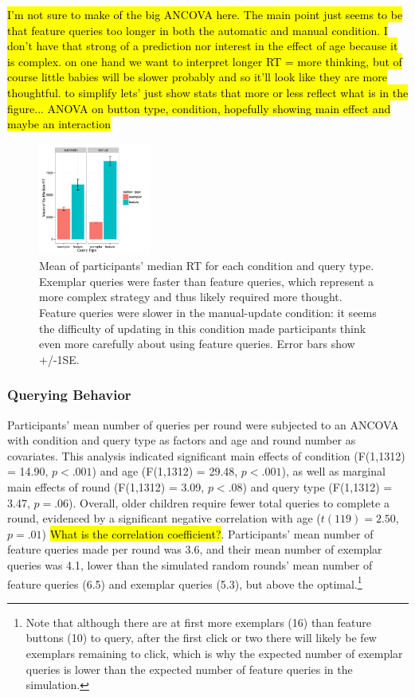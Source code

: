 \documentclass[10pt,letterpaper]{article}
\begin{document}
\hl{I'm not sure to make of the big ANCOVA here.  The main point just seems to be that
feature queries too longer in both the automatic and manual condition.  I don't have
that strong of a prediction nor interest in the effect of age because it is complex.  on
one hand we want to interpret longer RT = more thinking, but of course little babies
will be slower probably and so it'll look like they are more thoughtful.  to simplify
lets' just show stats that more or less reflect what is in the figure...  ANOVA on
button type, condition, hopefully showing main effect and maybe an interaction}

\begin{figure}[h]
  \centering
  \includegraphics[width=0.33\textwidth]{figures/RT_by_condition_query_type}
  \caption{Mean of participants' median RT for each condition and query type. 
Exemplar queries were faster than feature queries, which represent a more complex 
strategy and thus likely required more thought. Feature queries were slower in the 
manual-update condition: it seems the difficulty of updating in this condition made 
participants think even more carefully about using feature queries. Error bars show 
+/-1SE.}
  \label{fig:basic-rt}
\end{figure} 



\subsubsection{Querying Behavior}

Participants' mean number of queries per round were subjected to an 
ANCOVA with condition and query type as factors and age and round number as 
covariates. This analysis indicated significant main effects of condition (F(1,1312) = 
14.90, $p<.001$) and age (F(1,1312) = 29.48, $p<.001$), as well as marginal main 
effects of round (F(1,1312) = 3.09, $p<.08$) and query type (F(1,1312) = 3.47, $p=.
06$). Overall, older children require fewer total queries to complete a round, 
evidenced by a significant negative correlation with age ($t(119) = 2.50$, $p=.01$) \hl{What is the correlation coefficient?}. 
Participants' mean number of feature queries made per round was 3.6, and their 
mean number of exemplar queries was 4.1, lower than the simulated random 
rounds' mean number of feature queries (6.5) and exemplar queries (5.3), but above 
the optimal.\footnote{Note that although there are at first more exemplars (16) than 
feature buttons (10) to query, after the first click or two there will likely be few 
exemplars remaining to click, which is why the expected number of exemplar 
queries is lower than the expected number of feature queries in the simulation.} 
\end{document}
